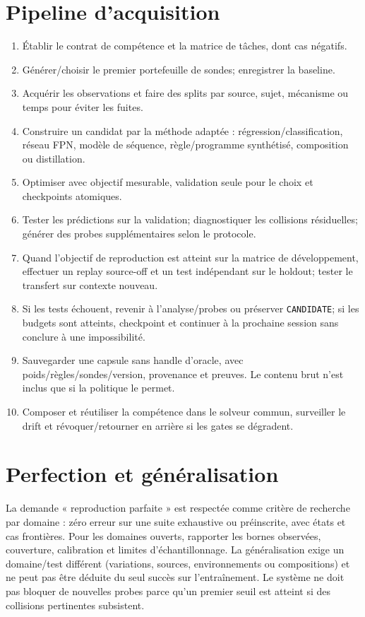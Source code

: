 \documentclass[11pt,a4paper,oneside]{report}
\begin{document}
\section{Pipeline d'acquisition}
\begin{enumerate}
\item Établir le contrat de compétence et la matrice de tâches, dont cas négatifs.
\item Générer/choisir le premier portefeuille de sondes; enregistrer la baseline.
\item Acquérir les observations et faire des splits par source, sujet, mécanisme ou temps pour éviter les fuites.
\item Construire un candidat par la méthode adaptée : régression/classification, réseau FPN, modèle de séquence, règle/programme synthétisé, composition ou distillation.
\item Optimiser avec objectif mesurable, validation seule pour le choix et checkpoints atomiques.
\item Tester les prédictions sur la validation; diagnostiquer les collisions résiduelles; générer des probes supplémentaires selon le protocole.
\item Quand l'objectif de reproduction est atteint sur la matrice de développement, effectuer un replay source-off et un test indépendant sur le holdout; tester le transfert sur contexte nouveau.
\item Si les tests échouent, revenir à l'analyse/probes ou préserver \texttt{CANDIDATE}; si les budgets sont atteints, checkpoint et continuer à la prochaine session sans conclure à une impossibilité.
\item Sauvegarder une capsule sans handle d'oracle, avec poids/règles/sondes/version, provenance et preuves. Le contenu brut n'est inclus que si la politique le permet.
\item Composer et réutiliser la compétence dans le solveur commun, surveiller le drift et révoquer/retourner en arrière si les gates se dégradent.
\end{enumerate}

\section{Perfection et généralisation}
La demande « reproduction parfaite » est respectée comme critère de recherche par domaine : zéro erreur sur une suite exhaustive ou préinscrite, avec états et cas frontières. Pour les domaines ouverts, rapporter les bornes observées, couverture, calibration et limites d'échantillonnage. La généralisation exige un domaine/test différent (variations, sources, environnements ou compositions) et ne peut pas être déduite du seul succès sur l'entraînement. Le système ne doit pas bloquer de nouvelles probes parce qu'un premier seuil est atteint si des collisions pertinentes subsistent.
\end{document}
